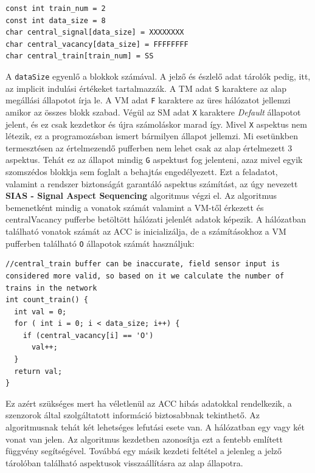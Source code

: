 \documentclass[a4paper,12pt]{article}
\begin{document}
\begin{minipage}{\linewidth}
\begin{lstlisting}[style=CStyle, caption={Tárolok inicializálása az ACC-ben},label=code:acc_array_init]
const int train_num = 2
const int data_size = 8
char central_signal[data_size] = XXXXXXXX
char central_vacancy[data_size] = FFFFFFFF
char central_train[train_num] = SS
\end{lstlisting}
\end{minipage}

A \texttt{dataSize} egyenlő a blokkok számával.
A jelző és észlelő adat tárolók pedig, itt, az implicit indulási értékeket tartalmazzák.
A TM adat \texttt{S} karaktere az alap megállási állapotot írja le.
A VM adat \texttt{F} karaktere az üres hálózatot jellemzi amikor az összes blokk szabad.
Végül az SM adat \texttt{X} karaktere \textit{Default}  állapotot jelent, és ez csak kezdetkor és újra számoláskor marad így.
Mivel \texttt{X} aspektus nem létezik, ez a programozásban ismert bármilyen állapot jellemzi.
Mi esetünkben termesztésen az értelmezendő pufferben nem lehet csak az alap értelmezett 3 aspektus.
Tehát ez az állapot mindig \texttt{G} aspektust fog jelenteni, azaz mivel egyik szomszédos blokkja sem foglalt a behajtás engedélyezett.
Ezt a feladatot, valamint a rendszer biztonságát garantáló aspektus számítást, az úgy nevezett \textbf{SIAS - Signal Aspect Sequencing} algoritmus végzi el.
Az algoritmus bemenetként mindig a vonatok számát valamint a VM-től érkezett és centralVacancy pufferbe betöltött hálózati jelenlét adatok képezik.
A hálózatban található vonatok számát az ACC is inicializálja, de a számításokhoz a VM pufferben található \texttt{O} állapotok számát használjuk:

\begin{minipage}{\linewidth}
\begin{lstlisting}[style=CStyle, caption={Mozdonyok számának meghatározása észlelési adatok alapján},label=code:acc_train_num]
//central_train buffer can be inaccurate, field sensor input is considered more valid, so based on it we calculate the number of trains in the network
int count_train() {
  int val = 0;
  for ( int i = 0; i < data_size; i++) {
    if (central_vacancy[i] == 'O')
      val++;
  }
  return val;
}
\end{lstlisting}
\end{minipage}

Ez azért szükséges mert ha véletlenül az ACC hibás adatokkal rendelkezik, a szenzorok által szolgáltatott információ biztosabbnak tekinthető.
Az algoritmusnak tehát két lehetséges lefutási esete van. A hálózatban egy vagy két vonat van jelen. 
Az algoritmus kezdetben azonosítja ezt a fentebb említett függvény segítségével.
Továbbá egy másik kezdeti feltétel a jelenleg a jelző tárolóban található aspektusok visszaállításra az alap állapotra.
\end{document}
